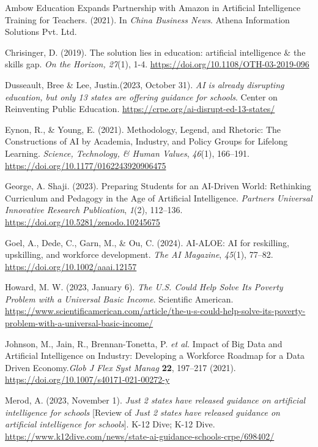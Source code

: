 \documentclass[11pt]{article}
\begin{document}
\begin{references}[Reference]
\item Ambow Education Expands Partnership with Amazon in Artificial Intelligence Training for Teachers. (2021). In \textit{China Business News}. Athena Information Solutions Pvt. Ltd.
\item Chrisinger, D. (2019). The solution lies in education: artificial intelligence \& the skills gap. \textit{On the Horizon, 27}(1), 1-4. \url{https://doi.org/10.1108/OTH-03-2019-096}
\item Dusseault, Bree \& Lee, Justin.(2023, October 31). \textit{AI is already disrupting education, but only 13 states are offering guidance for schools}. Center on Reinventing Public Education. \url{https://crpe.org/ai-disrupt-ed-13-states/}
\item Eynon, R., \& Young, E. (2021). Methodology, Legend, and Rhetoric: The Constructions of AI by Academia, Industry, and Policy Groups for Lifelong Learning. \textit{Science, Technology, \& Human Values}, \textit{46}(1), 166–191. \url{https://doi.org/10.1177/0162243920906475}
\item George, A. Shaji. (2023). Preparing Students for an AI-Driven World: Rethinking Curriculum and Pedagogy in the Age of Artificial Intelligence. \textit{Partners Universal Innovative Research Publication}, \textit{1}(2), 112–136. \url{https://doi.org/10.5281/zenodo.10245675}
\item Goel, A., Dede, C., Garn, M., \& Ou, C. (2024). AI‐ALOE: AI for reskilling, upskilling, and workforce development. \textit{The AI Magazine}, \textit{45}(1), 77–82. \url{https://doi.org/10.1002/aaai.12157}
\item Howard, M. W. (2023, January 6). \textit{The U.S. Could Help Solve Its Poverty Problem with a Universal Basic Income}. Scientific American. \url{https://www.scientificamerican.com/article/the-u-s-could-help-solve-its-poverty-problem-with-a-universal-basic-income/}
\item Johnson, M., Jain, R., Brennan-Tonetta, P. \textit{et al.} Impact of Big Data and Artificial Intelligence on Industry: Developing a Workforce Roadmap for a Data Driven Economy.\textit{Glob J Flex Syst Manag} \textbf{22}, 197–217 (2021). \url{https://doi.org/10.1007/s40171-021-00272-y}
\item Merod, A. (2023, November 1). \textit{Just 2 states have released guidance on artificial intelligence for schools} [Review of \textit{Just 2 states have released guidance on artificial intelligence for schools}]. K-12 Dive; K-12 Dive. \url{https://www.k12dive.com/news/state-ai-guidance-schools-crpe/698402/}
\end{references}
\end{document}
